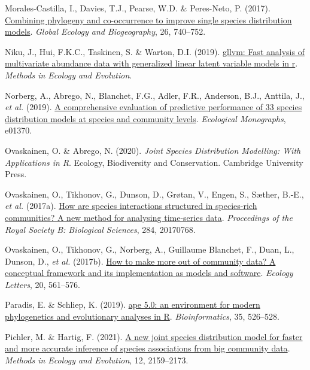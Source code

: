 \documentclass[9pt,biorxiv,doublespacing,lineno,endfloat]{lapreprint}
\newlength{\cslhangindent}
\newlength{\cslentryspacingunit} %
\newenvironment{CSLReferences}[2] %
 {%
  \setlength{\parindent}{0pt}
  \ifodd #1
  \let\oldpar\par
  \def\par{\hangindent=\cslhangindent\oldpar}
  \fi
  \setlength{\parskip}{#2\cslentryspacingunit}
 }%
 {}
\begin{document}
\begin{CSLReferences}{1}{0}
\leavevmode{}%
Morales-Castilla, I., Davies, T.J., Pearse, W.D. \& Peres-Neto, P.
(2017). \href{https://doi.org/10.1111/geb.12580}{Combining phylogeny and
co-occurrence to improve single species distribution models}.
\emph{Global Ecology and Biogeography}, 26, 740--752.

\leavevmode{}%
Niku, J., Hui, F.K.C., Taskinen, S. \& Warton, D.I. (2019).
\href{https://doi.org/10.1111/2041-210X.13303}{gllvm: Fast analysis of
multivariate abundance data with generalized linear latent variable
models in r}. \emph{Methods in Ecology and Evolution}.

\leavevmode{}%
Norberg, A., Abrego, N., Blanchet, F.G., Adler, F.R., Anderson, B.J.,
Anttila, J., \emph{et al.} (2019).
\href{https://doi.org/10.1002/ecm.1370}{A comprehensive evaluation of
predictive performance of 33 species distribution models at species and
community levels}. \emph{Ecological Monographs}, e01370.

\leavevmode{}%
Ovaskainen, O. \& Abrego, N. (2020). \emph{Joint Species Distribution
Modelling: With Applications in R}. Ecology, Biodiversity and
Conservation. Cambridge University Press.

\leavevmode{}%
Ovaskainen, O., Tikhonov, G., Dunson, D., Grøtan, V., Engen, S., Sæther,
B.-E., \emph{et al.} (2017a).
\href{https://doi.org/10.1098/rspb.2017.0768}{How are species
interactions structured in species-rich communities? A new method for
analysing time-series data}. \emph{Proceedings of the Royal Society B:
Biological Sciences}, 284, 20170768.

\leavevmode{}%
Ovaskainen, O., Tikhonov, G., Norberg, A., Guillaume Blanchet, F., Duan,
L., Dunson, D., \emph{et al.} (2017b).
\href{https://doi.org/10.1111/ele.12757}{How to make more out of
community data? A conceptual framework and its implementation as models
and software}. \emph{Ecology Letters}, 20, 561--576.

\leavevmode{}%
Paradis, E. \& Schliep, K. (2019).
\href{https://doi.org/10.1093/bioinformatics/bty633}{ape 5.0: an
environment for modern phylogenetics and evolutionary analyses in R}.
\emph{Bioinformatics}, 35, 526--528.

\leavevmode{}%
Pichler, M. \& Hartig, F. (2021).
\href{https://doi.org/10.1111/2041-210X.13687}{A new joint species
distribution model for faster and more accurate inference of species
associations from big community data}. \emph{Methods in Ecology and
Evolution}, 12, 2159--2173.


\end{CSLReferences}
\end{document}
